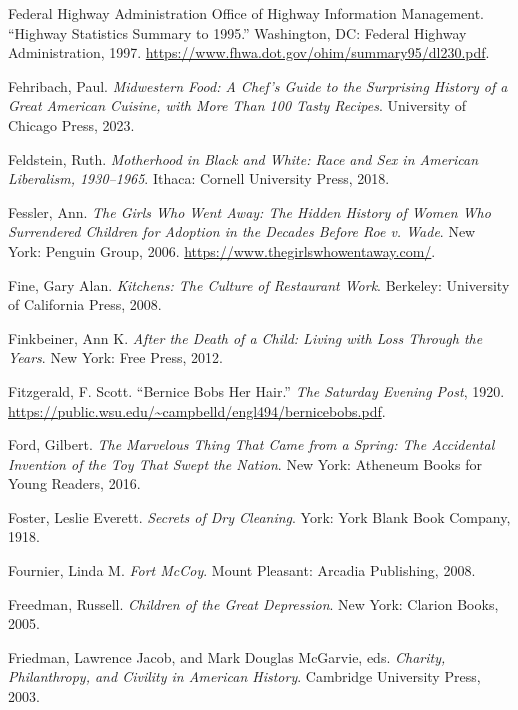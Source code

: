 \documentclass[
  letterpaper,
]{book}
\newlength{\cslhangindent}
\newenvironment{CSLReferences}[2] %
 {\begin{list}{}{%
  \setlength{\itemindent}{0pt}
  \setlength{\leftmargin}{0pt}
  \setlength{\parsep}{0pt}
  \ifodd #1
   \setlength{\leftmargin}{\cslhangindent}
   \setlength{\itemindent}{-1\cslhangindent}
  \fi
  \setlength{\itemsep}{#2\baselineskip}}}
 {\end{list}}
\begin{document}
\begin{CSLReferences}{1}{0}
Federal Highway Administration Office of Highway Information Management.
{``Highway Statistics Summary to 1995.''} Washington, DC: Federal
Highway Administration, 1997.
\url{https://www.fhwa.dot.gov/ohim/summary95/dl230.pdf}.

Fehribach, Paul. \emph{Midwestern Food: A Chef's Guide to the Surprising
History of a Great American Cuisine, with More Than 100 Tasty Recipes}.
University of Chicago Press, 2023.

Feldstein, Ruth. \emph{Motherhood in Black and White: Race and Sex in
American Liberalism, 1930--1965}. Ithaca: Cornell University Press,
2018.

Fessler, Ann. \emph{The Girls Who Went Away: The Hidden History of Women
Who Surrendered Children for Adoption in the Decades Before Roe v.
Wade}. New York: Penguin Group, 2006.
\url{https://www.thegirlswhowentaway.com/}.

Fine, Gary Alan. \emph{Kitchens: The Culture of Restaurant Work}.
Berkeley: University of California Press, 2008.

Finkbeiner, Ann K. \emph{After the Death of a Child: Living with Loss
Through the Years}. New York: Free Press, 2012.

Fitzgerald, F. Scott. {``Bernice Bobs Her Hair.''} \emph{The Saturday
Evening Post}, 1920.
\url{https://public.wsu.edu/~campbelld/engl494/bernicebobs.pdf}.

Ford, Gilbert. \emph{The Marvelous Thing That Came from a Spring: The
Accidental Invention of the Toy That Swept the Nation}. New York:
Atheneum Books for Young Readers, 2016.

Foster, Leslie Everett. \emph{Secrets of Dry Cleaning}. York: York Blank
Book Company, 1918.

Fournier, Linda M. \emph{Fort McCoy}. Mount Pleasant: Arcadia
Publishing, 2008.

Freedman, Russell. \emph{Children of the Great Depression}. New York:
Clarion Books, 2005.

Friedman, Lawrence Jacob, and Mark Douglas McGarvie, eds. \emph{Charity,
Philanthropy, and Civility in American History}. Cambridge University
Press, 2003.


\end{CSLReferences}
\end{document}

